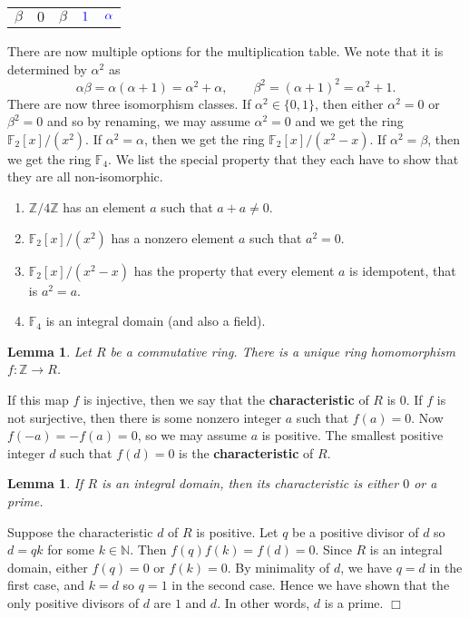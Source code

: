 \documentclass{article}
\def\Z{{\mathbb Z}}
\def\F{{\mathbb F}}
\def\N{{\mathbb N}}
\def\Z{{\mathbb Z}}
\def\F{{\mathbb F}}
\newtheorem{lemma}[subsection]{Lemma}
\newenvironment{proof}{\noindent {\bf Proof:}}{$\Box$ \vspace{2 ex}}
\newcommand{\add}[1]{{\color{blue} #1}}
\begin{document}
\begin{enumerate}
\begin{center}
\begin{tabular}{c|c|c|c|c}
             $\beta$&$0$&$\beta$&$\add{1}$&$\add{\alpha}$
    \end{tabular}
    \end{center}
    There are now multiple options for the multiplication table. We note that it is determined by $\alpha^2$ as $$\alpha\beta = \alpha(\alpha+1) = \alpha^2 + \alpha,\qquad\beta^2 = (\alpha+1)^2 = \alpha^2 + 1.$$ There are now three isomorphism classes. If $\alpha^2\in\{0,1\}$, then either $\alpha^2 = 0$ or $\beta^2 = 0$ and so by renaming, we may assume $\alpha^2 = 0$ and we get the ring $\F_2[x]/(x^2)$. If $\alpha^2 = \alpha$, then we get the ring $\F_2[x]/(x^2 - x).$ If $\alpha^2 = \beta$, then we get the ring $\F_4$. We list the special property that they each have to show that they are all non-isomorphic.
    \begin{enumerate}
        \item $\Z/4\Z$ has an element $a$ such that $a + a\neq 0$.
        \item $\F_2[x]/(x^2)$ has a nonzero element $a$ such that $a^2 = 0$.
        \item $\F_2[x]/(x^2 - x)$ has the property that every element $a$ is idempotent, that is $a^2 = a$.
        \item $\F_4$ is an integral domain (and also a field).
    \end{enumerate}

    \begin{lemma}\label{lem:can}
        Let $R$ be a commutative ring. There is a unique ring homomorphism $f:\Z\rightarrow R$.
    \end{lemma}

    If this map $f$ is injective, then we say that the \textbf{characteristic} of $R$ is $0$. If $f$ is not surjective, then there is some nonzero integer $a$ such that $f(a) = 0$. Now $f(-a) = -f(a) = 0$, so we may assume $a$ is positive. The smallest positive integer $d$ such that $f(d) = 0$ is the \textbf{characteristic} of $R$.

    \begin{lemma}
        If $R$ is an integral domain, then its characteristic is either $0$ or a prime.
    \end{lemma}

    \begin{proof}
        Suppose the characteristic $d$ of $R$ is positive. Let $q$ be a positive divisor of $d$ so $d = qk$ for some $k\in\N$. Then $f(q)f(k) = f(d) = 0$. Since $R$ is an integral domain, either $f(q) = 0$ or $f(k) = 0$. By minimality of $d$, we have $q = d$ in the first case, and $k = d$ so $q = 1$ in the second case. Hence we have shown that the only positive divisors of $d$ are $1$ and $d$. In other words, $d$ is a prime.
    \end{proof}


\end{enumerate}
\end{document}
